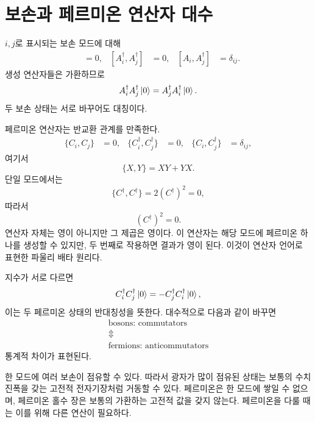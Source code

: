 \section{보손과 페르미온 연산자 대수}

\(i,j\)로 표시되는 보손 모드에 대해
\begin{align}
[A_i,A_j]&=0,&
[A_i^\dagger,A_j^\dagger]&=0,&
[A_i,A_j^\dagger]&=\delta_{ij}.
\end{align}
생성 연산자들은 가환하므로
\begin{equation}
A_i^\dagger A_j^\dagger\left\lvert0\right\rangle
=A_j^\dagger A_i^\dagger\left\lvert0\right\rangle.
\end{equation}
두 보손 상태는 서로 바꾸어도 대칭이다.

페르미온 연산자는 반교환 관계를 만족한다.
\begin{align}
\{C_i,C_j\}&=0,&
\{C_i^\dagger,C_j^\dagger\}&=0,&
\{C_i,C_j^\dagger\}&=\delta_{ij},
\end{align}
여기서
\begin{equation}
\{X,Y\}=XY+YX.
\end{equation}
단일 모드에서는
\begin{equation}
\{C^\dagger,C^\dagger\}=2(C^\dagger)^2=0,
\end{equation}
따라서
\begin{equation}
(C^\dagger)^2=0.
\end{equation}
연산자 자체는 영이 아니지만 그 제곱은 영이다. 이 연산자는 해당 모드에 페르미온 하나를 생성할 수 있지만, 두 번째로 작용하면 결과가 영이 된다. 이것이 연산자 언어로 표현한 파울리 배타 원리다.

지수가 서로 다르면
\begin{equation}
C_i^\dagger C_j^\dagger\left\lvert0\right\rangle
=-C_j^\dagger C_i^\dagger\left\lvert0\right\rangle,
\end{equation}
이는 두 페르미온 상태의 반대칭성을 뜻한다. 대수적으로 다음과 같이 바꾸면
\begin{equation}
\begin{gathered}
\text{bosons: commutators}\\
\Updownarrow\\
\text{fermions: anticommutators}
\end{gathered}
\end{equation}
통계적 차이가 표현된다.

한 모드에 여러 보손이 점유할 수 있다. 따라서 광자가 많이 점유된 상태는 보통의 수치 진폭을 갖는 고전적 전자기장처럼 거동할 수 있다. 페르미온은 한 모드에 쌓일 수 없으며, 페르미온 홀수 장은 보통의 가환하는 고전적 값을 갖지 않는다. 페르미온을 다룰 때는 이를 위해 다른 연산이 필요하다.

